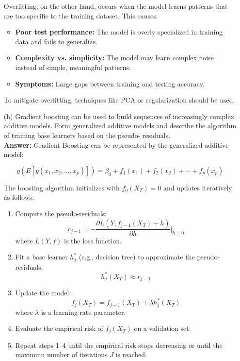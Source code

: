\documentclass[12pt,letterpaper]{article}
\begin{document}
\begin{itemize}
    Overfitting, on the other hand, occurs when the model learns patterns that are too specific to the training dataset. This causes:
    \begin{itemize}
        \item \textbf{Poor test performance:} The model is overly specialized in training data and fails to generalize.
        \item \textbf{Complexity vs. simplicity:} The model may learn complex noise instead of simple, meaningful patterns.
        \item \textbf{Symptoms:} Large gaps between training and testing accuracy.
    \end{itemize}
    
    To mitigate overfitting, techniques like PCA or regularization should be used.
    \item[(h)] Gradient boosting can be used to build sequences of increasingly complex additive models. Form
    generalized additive models and describe the algorithm of training base learners based on the pseudo-
    residuals.
    \vspace{1.0cm}
    \\ \textbf{Answer:} Gradient Boosting can be represented by the generalized additive model:

    \[
    g(E[y(x_1, x_2, ..., x_p)]) = \beta_0 + f_1(x_1) + f_2(x_2) + \cdots + f_p(x_p)
    \]
    
    The boosting algorithm initializes with \( f_0(X_T) = 0 \) and updates iteratively as follows:
    
    \begin{enumerate}
        \item Compute the pseudo-residuals:
        \[
        r_{j-1} = -\frac{\partial L(Y, f_{j-1}(X_T) + h)}{\partial h} \Big|_{h=0}
        \]
        where \( L(Y, f) \) is the loss function.
        
        \item Fit a base learner \( h_j^* \) (e.g., decision tree) to approximate the pseudo-residuals:
        \[
        h_j^*(X_T) \approx r_{j-1}
        \]
    
        \item Update the model:
        \[
        f_j(X_T) = f_{j-1}(X_T) + \lambda h_j^*(X_T)
        \]
        where \( \lambda \) is a learning rate parameter.
    
        \item Evaluate the empirical risk of \( f_j(X_T) \) on a validation set.
    
        \item Repeat steps 1–4 until the empirical risk stops decreasing or until the maximum number of iterations \( J \) is reached.
    \end{enumerate}
    
\end{itemize}
\pagebreak
\end{document}
